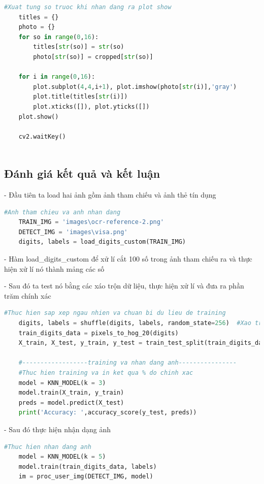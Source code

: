 \begin{lstlisting}[language=Python, caption=Recognition Visa]
    #Xuat tung so truoc khi nhan dang ra plot show
    titles = {}
    photo = {}
    for so in range(0,16):		
        titles[str(so)] = str(so)
        photo[str(so)] = cropped[str(so)]
    
    for i in range(0,16):
        plot.subplot(4,4,i+1), plot.imshow(photo[str(i)],'gray')
        plot.title(titles[str(i)])
        plot.xticks([]), plot.yticks([])
    plot.show()
        
    cv2.waitKey()           
    
\end{lstlisting}

\subsection{Đánh giá kết quả và kết luận}

- Đầu tiên ta load hai ảnh gồm ảnh tham chiếu và ảnh thẻ tín dụng
\begin{lstlisting}[language=Python]
    #Anh tham chieu va anh nhan dang
    TRAIN_IMG = 'images\ocr-reference-2.png'
    DETECT_IMG = 'images\visa.png'
    digits, labels = load_digits_custom(TRAIN_IMG)
\end{lstlisting}

- Hàm load\_digits\_custom để xử lí cắt 100 số trong ảnh tham chiếu ra và thực hiện xử lí nó thành mảng các số

- Sau đó ta test nó bằng các xáo trộn dữ liệu, thực hiện xử lí và đưa ra phần trăm chính xác

\begin{lstlisting}[language=Python]
    #Thuc hien sap xep ngau nhien va chuan bi du lieu de training
    digits, labels = shuffle(digits, labels, random_state=256)  #Xao tron du lieu
    train_digits_data = pixels_to_hog_20(digits)
    X_train, X_test, y_train, y_test = train_test_split(train_digits_data, labels, test_size=0.7)

    #------------------training va nhan dang anh----------------
    #Thuc hien training va in ket qua % do chinh xac
    model = KNN_MODEL(k = 3)
    model.train(X_train, y_train)
    preds = model.predict(X_test)
    print('Accuracy: ',accuracy_score(y_test, preds))
\end{lstlisting}

- Sau đó thực hiện nhận dạng ảnh
\begin{lstlisting}[language=Python]
    #Thuc hien nhan dang anh 
    model = KNN_MODEL(k = 5)
    model.train(train_digits_data, labels)
    im = proc_user_img(DETECT_IMG, model)
\end{lstlisting}

